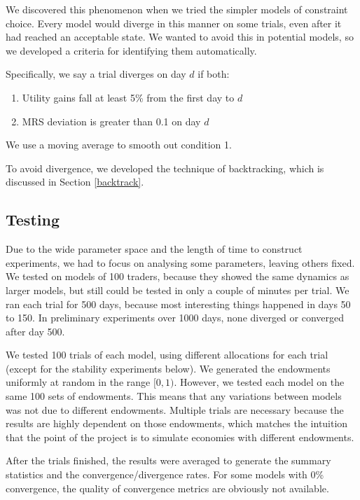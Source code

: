\documentclass[12pt,a4paper,titlepage]{article}
\begin{document}

We discovered this phenomenon when we tried the simpler models of constraint choice.
Every model would diverge in this manner on some trials, even after it had reached an acceptable state.
We wanted to avoid this in potential models, so we developed a criteria for identifying them automatically.

Specifically, we say a trial diverges on day $d$ if both:
\begin{enumerate}
  \item Utility gains fall at least 5\% from the first day to $d$ 
  \item MRS deviation is greater than 0.1 on day $d$
\end{enumerate}
We use a moving average to smooth out condition 1.
    
To avoid divergence, we developed the technique of backtracking, which is discussed in Section \ref{backtrack}.

\subsection{Testing}
Due to the wide parameter space and the length of time to construct experiments, we had to focus on analysing some parameters, leaving others fixed.
We tested on models of 100 traders, because they showed the same dynamics as larger models, but still could be tested in only a couple of minutes per trial.
We ran each trial for 500 days, because most interesting things happened in days 50 to 150.
In preliminary experiments over 1000 days, none diverged or converged after day 500.


We tested 100 trials of each model, using different allocations for each trial (except for the stability experiments below).
We generated the endowments uniformly at random in the range $[0, 1)$.
However, we tested each model on the same 100 sets of endowments.
This means that any variations between models was not due to different endowments.
Multiple trials are necessary because the results are highly dependent on those endowments, which matches the intuition that the point of the project is to simulate economies with different endowments.
    
After the trials finished, the results were averaged to generate the summary statistics and the convergence/divergence rates.
For some models with 0\% convergence, the quality of convergence metrics are obviously not available.
\end{document}
